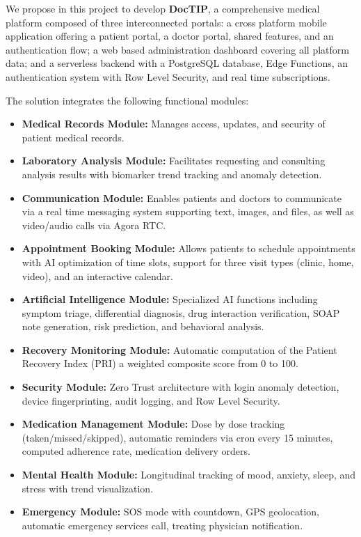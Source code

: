 \documentclass[12pt,a4paper,oneside]{report}
\begin{document}
We propose in this project to develop \textbf{DocTIP}, a comprehensive medical platform composed of three interconnected portals: a cross platform mobile application offering a patient portal, a doctor portal, shared features, and an authentication flow; a web based administration dashboard covering all platform data; and a serverless backend with a PostgreSQL database, Edge Functions, an authentication system with Row Level Security, and real time subscriptions.

The solution integrates the following functional modules:

\begin{itemize}
    \item \textbf{Medical Records Module:} Manages access, updates, and security of patient medical records.
    \item \textbf{Laboratory Analysis Module:} Facilitates requesting and consulting analysis results with biomarker trend tracking and anomaly detection.
    \item \textbf{Communication Module:} Enables patients and doctors to communicate via a real time messaging system supporting text, images, and files, as well as video/audio calls via Agora RTC.
    \item \textbf{Appointment Booking Module:} Allows patients to schedule appointments with AI optimization of time slots, support for three visit types (clinic, home, video), and an interactive calendar.
    \item \textbf{Artificial Intelligence Module:} Specialized AI functions including symptom triage, differential diagnosis, drug interaction verification, SOAP note generation, risk prediction, and behavioral analysis.
    \item \textbf{Recovery Monitoring Module:} Automatic computation of the Patient Recovery Index (PRI) a weighted composite score from 0 to 100.
    \item \textbf{Security Module:} Zero Trust architecture with login anomaly detection, device fingerprinting, audit logging, and Row Level Security.
    \item \textbf{Medication Management Module:} Dose by dose tracking (taken/missed/skipped), automatic reminders via cron every 15 minutes, computed adherence rate, medication delivery orders.
    \item \textbf{Mental Health Module:} Longitudinal tracking of mood, anxiety, sleep, and stress with trend visualization.
    \item \textbf{Emergency Module:} SOS mode with countdown, GPS geolocation, automatic emergency services call, treating physician notification.
\end{itemize}
\end{document}
